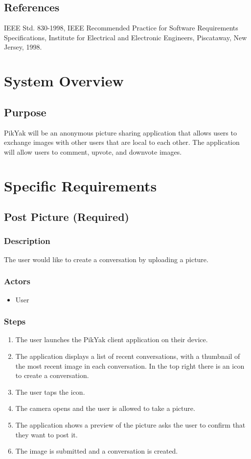 \documentclass[11pt]{scrartcl}
\let\stdsection\section
\renewcommand\section{\newpage\stdsection}
\begin{document}
    \subsection{References}
        IEEE Std. 830-1998, IEEE Recommended Practice for Software Requirements Specifications, Institute for Electrical and Electronic Engineers, Piscataway, New Jersey, 1998.

\section{System Overview}
    \subsection{Purpose}
        PikYak will be an anonymous picture sharing application that allows users to exchange images with other users that are local to each other.  The application will allow users to comment, upvote, and downvote images.

\section{Specific Requirements}
    \subsection{Post Picture (Required)}
        \subsubsection{Description}
            The user would like to create a conversation by uploading a picture.
        \subsubsection{Actors}
            \begin{itemize}
                \item User
            \end{itemize}
        \subsubsection{Steps}
            \begin{enumerate}
                \item The user launches the PikYak client application on their device.
                \item The application displays a list of recent conversations, with a thumbnail of the most recent image in each conversation. In the top right there is an icon to create a conversation.
                \item The user taps the icon.
                \item The camera opens and the user is allowed to take a picture.
                \item The application shows a preview of the picture asks the user to confirm that they want to post it.
                \item The image is submitted and a conversation is created.
            \end{enumerate}
    
\end{document}
